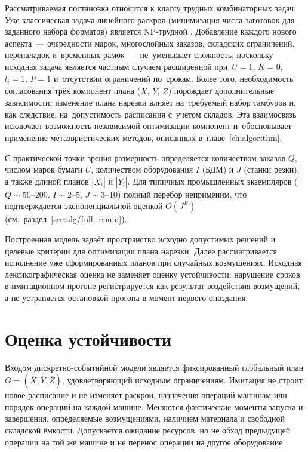 Рассматриваемая постановка относится к классу трудных комбинаторных задач.
Уже классическая задача линейного раскроя (минимизация числа заготовок для заданного набора форматов) является NP-трудной \cite{garey1979computers}.
Добавление каждого нового аспекта~--- очерёдности марок, многослойных заказов, складских ограничений, переналадок и~временных рамок~--- не~уменьшает сложность, поскольку исходная задача является частным случаем расширенной при~$U=1$, $K=0$, $l_i=1$, $P=1$ и~отсутствии ограничений по~срокам.
Более того, необходимость согласования трёх компонент плана ($\overline{\overline{X}}$, $\overline{\overline{Y}}$, $\overline{\overline{Z}}$) порождает дополнительные зависимости: изменение плана нарезки влияет на~требуемый набор тамбуров и, как следствие, на~допустимость расписания с~учётом складов.
Эта взаимосвязь исключает возможность независимой оптимизации компонент и~обосновывает применение метаэвристических методов, описанных в~главе~\ref{ch:algorithm}.


С практической точки зрения размерность определяется количеством заказов $Q$, числом марок бумаги $U$, количеством оборудования $I$ (БДМ) и $J$ (станки резки), а также длиной планов $|\overline{X}_i|$ и $|\overline{Y}_i|$.
Для типичных промышленных экземпляров ($Q\sim 50$--$200$, $I\sim 2$--$5$, $J\sim 3$--$10$) полный перебор неприменим, что подтверждается экспоненциальной оценкой $O(J^R)$ (см.~раздел~\ref{sec:alg/full_enum}).

Построенная модель задаёт пространство исходно допустимых решений и целевые критерии для оптимизации плана нарезки. Далее рассматривается исполнение уже сформированных планов при случайных возмущениях. Исходная лексикографическая оценка не заменяет оценку устойчивости: нарушение сроков в имитационном прогоне регистрируется как результат воздействия возмущений, а не устраняется остановкой прогона в момент первого опоздания.

\section{Оценка устойчивости}\label{sec:model/simulation}\label{sec:alg/simulation}
Входом дискретно-событийной модели является фиксированный глобальный план $G=(\overline{\overline{X}},\overline{\overline{Y}},\overline{\overline{Z}})$, удовлетворяющий исходным ограничениям. Имитация не строит новое расписание и не изменяет раскрои, назначения операций машинам или порядок операций на каждой машине. Меняются фактические моменты запуска и завершения, определяемые возмущениями, наличием материала и свободной складской ёмкости. Допускается ожидание ресурсов, но не обход предыдущей операции на той же машине и не перенос операции на другое оборудование.


